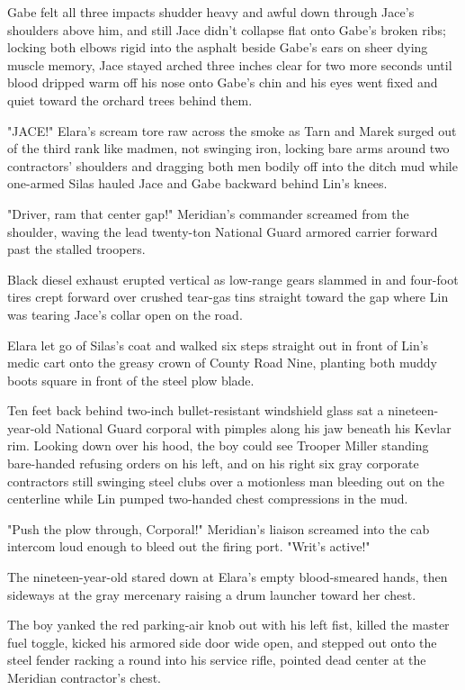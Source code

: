 Gabe felt all three impacts shudder heavy and awful down through Jace's shoulders above him, and still Jace didn't collapse flat onto Gabe's broken ribs; locking both elbows rigid into the asphalt beside Gabe's ears on sheer dying muscle memory, Jace stayed arched three inches clear for two more seconds until blood dripped warm off his nose onto Gabe's chin and his eyes went fixed and quiet toward the orchard trees behind them.

"JACE!" Elara's scream tore raw across the smoke as Tarn and Marek surged out of the third rank like madmen, not swinging iron, locking bare arms around two contractors' shoulders and dragging both men bodily off into the ditch mud while one-armed Silas hauled Jace and Gabe backward behind Lin's knees.

"Driver, ram that center gap!" Meridian's commander screamed from the shoulder, waving the lead twenty-ton National Guard armored carrier forward past the stalled troopers.

Black diesel exhaust erupted vertical as low-range gears slammed in and four-foot tires crept forward over crushed tear-gas tins straight toward the gap where Lin was tearing Jace's collar open on the road.

Elara let go of Silas's coat and walked six steps straight out in front of Lin's medic cart onto the greasy crown of County Road Nine, planting both muddy boots square in front of the steel plow blade.

Ten feet back behind two-inch bullet-resistant windshield glass sat a nineteen-year-old National Guard corporal with pimples along his jaw beneath his Kevlar rim. Looking down over his hood, the boy could see Trooper Miller standing bare-handed refusing orders on his left, and on his right six gray corporate contractors still swinging steel clubs over a motionless man bleeding out on the centerline while Lin pumped two-handed chest compressions in the mud.

"Push the plow through, Corporal!" Meridian's liaison screamed into the cab intercom loud enough to bleed out the firing port. "Writ's active!"

The nineteen-year-old stared down at Elara's empty blood-smeared hands, then sideways at the gray mercenary raising a drum launcher toward her chest.

The boy yanked the red parking-air knob out with his left fist, killed the master fuel toggle, kicked his armored side door wide open, and stepped out onto the steel fender racking a round into his service rifle, pointed dead center at the Meridian contractor's chest.

